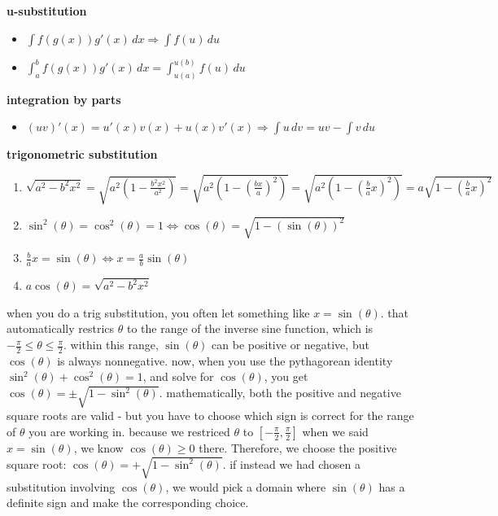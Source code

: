 \documentclass{article}
\begin{document}
\textbf{u-substitution}
        \begin{itemize}
                \item $\int f(g(x))g'(x)\,dx \Rightarrow \int f(u)\,du$
		\item $\int_{a}^{b}f(g(x))g'(x)\,dx = \int_{u(a)}^{u(b)}f(u)\,du$
        \end{itemize}
                
\textbf{integration by parts}
        \begin{itemize}
                \item $(uv)'(x) = u'(x)v(x) + u(x)v'(x) \Rightarrow \int u\,dv = uv - \int v\,du$
        \end{itemize}

\textbf{trigonometric substitution}
	\begin{enumerate}
		\item $\sqrt{a^2 - b^2x^2} = \sqrt{a^2(1 - \frac{b^2x^2}{a^2})} = \sqrt{a^2(1 - (\frac{bx}{a})^2)} = \sqrt{a^2(1 - (\frac{b}{a}x)^2)} = a\sqrt{1 - (\frac{b}{a}x)^2}$
		\item $\sin^2(\theta) = \cos^2(\theta) = 1 \Leftrightarrow \cos(\theta) = \sqrt{1 - (\sin(\theta))^2}$ 
		\item $\frac{b}{a}x = \sin(\theta) \Leftrightarrow x = \frac{a}{b}\sin(\theta)$
		\item $a\cos(\theta) = \sqrt{a^2 - b^2x^2}$
	\end{enumerate}

when you do a trig substitution, you often let something like $x = \sin(\theta)$. that automatically restrics $\theta$ to the range of the inverse sine function, which is $-\frac{\pi}{2} \leq \theta \leq \frac{\pi}{2}$. within this range, $\sin(\theta)$ can be positive or negative, but $\cos(\theta)$ is always nonnegative. now, when you use the pythagorean identity $\sin^2(\theta) + \cos^2(\theta) = 1$, and solve for $\cos(\theta)$, you get $\cos(\theta) = \pm \sqrt{1 - \sin^2(\theta)}$. mathematically, both the positive and negative square roots are valid - but you have to choose which sign is correct for the range of $\theta$ you are working in. because we restriced $\theta$ to $[-\frac{\pi}{2}, \frac{\pi}{2}]$ when we said $x = \sin(\theta)$, we know $\cos(\theta) \geq 0$ there. Therefore, we choose the positive square root: $\cos(\theta) = + \sqrt{1 - \sin^2(\theta)}$. if instead we had chosen a substitution involving $\cos(\theta)$, we would pick a domain where $\sin(\theta)$ has a definite sign and make the corresponding choice.\\
\end{document}
